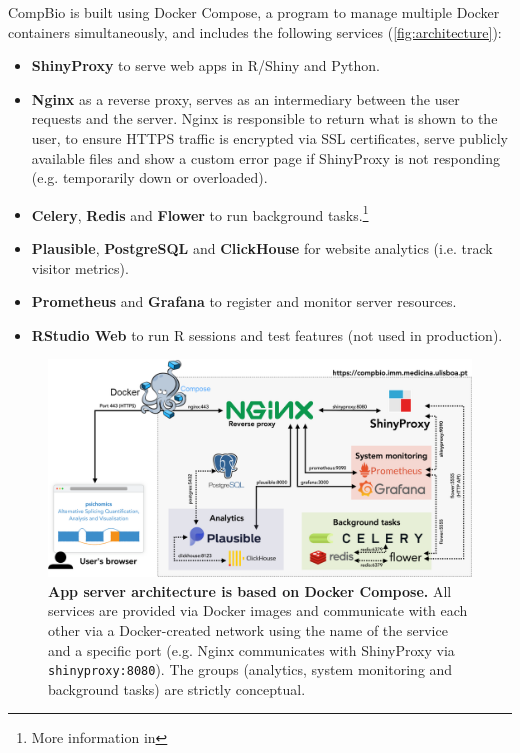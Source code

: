 CompBio is built using Docker Compose, a program to manage multiple Docker containers simultaneously, and includes the following services (\autoref{fig:architecture}):

\begin{itemize}
	\item \textbf{ShinyProxy} to serve web apps in R/Shiny and Python.
	\item \textbf{Nginx} as a reverse proxy, serves as an intermediary between the user requests and the server. Nginx is responsible to return what is shown to the user, to ensure HTTPS traffic is encrypted via SSL certificates, serve publicly available files and show a custom error page if ShinyProxy is not responding (e.g. temporarily down or overloaded).
	\item \textbf{Celery}, \textbf{Redis} and \textbf{Flower} to run background tasks.\footnote{More information in }
	\item \textbf{Plausible}, \textbf{PostgreSQL} and \textbf{ClickHouse} for website analytics (i.e. track visitor metrics).
	\item \textbf{Prometheus} and \textbf{Grafana} to register and monitor server resources.
	\item \textbf{RStudio Web} to run R sessions and test features (not used in production).
\end{itemize}

\begin{figure}[!h]
  \includegraphics[width=1\textwidth]{images/app-server/architecture}
  \centering
  \caption[App server architecture]{\textbf{App server architecture is based on Docker Compose.} All services are provided via Docker images and communicate with each other via a Docker-created network using the name of the service and a specific port (e.g. Nginx communicates with ShinyProxy via \texttt{shinyproxy:8080}). The groups  (analytics, system monitoring and background tasks) are strictly conceptual.}
  \label{fig:architecture}
\end{figure}


